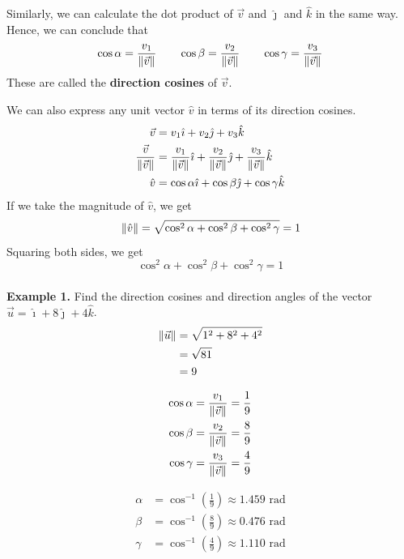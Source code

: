 \newpage
Similarly, we can calculate the dot product of $\vec{v}$ and $\hat{\jmath}$ and
$\hat{k}$ in the same way. Hence, we can conclude that \[\cos\alpha = \frac{v_1}{\left\lVert\vec{v}\right\rVert} \qquad \cos\beta = \frac{v_2}{\left\lVert\vec{v}\right\rVert} \qquad \cos\gamma = \frac{v_3}{\left\lVert\vec{v}\right\rVert}\]
These are called the \textbf{direction cosines} of $\vec{v}$.

We can also express any unit vector $\hat{v}$ in terms of its direction
cosines.
\begin{align*}
    \vec{v}                         & = v_1\hat{\imath} + v_2\hat{\jmath} + v_3\hat{k}                                                                         \\
    \dfrac{\vec{v}}{\left\lVert\vec{v}\right\rVert} & = \dfrac{v_1}{\left\lVert\vec{v}\right\rVert}\hat{\imath} + \dfrac{v_2}{\left\lVert\vec{v}\right\rVert}\hat{\jmath} + \dfrac{v_3}{\left\lVert\vec{v}\right\rVert}\hat{k} \\
    \hat{v}                         & = \cos\alpha\hat{\imath} + \cos\beta\hat{\jmath} + \cos\gamma\hat{k}
\end{align*}
If we take the magnitude of $\hat{v}$, we get \[\left\lVert\hat{v}\right\rVert = \sqrt{\cos^2\alpha + \cos^2\beta + \cos^2\gamma} = 1\] Squaring both sides, we get \[\cos^2\alpha + \cos^2\beta + \cos^2\gamma = 1\]
~\\
\noindent\textbf{Example 1. } Find the direction cosines and direction angles of the vector $\vec{u} = \hat{\imath} + 8\hat{\jmath} + 4\hat{k}$.
\begin{align*}
    \left\lVert\vec{u}\right\rVert & = \sqrt{1^2 + 8^2 + 4^2} \\
                   & = \sqrt{81}              \\
                   & = 9
\end{align*}
\vspace{-5em}
\begin{multicols}{2}
    \begin{align*}
        \cos\alpha & = \frac{v_1}{\left\lVert\vec{v}\right\rVert} = \frac{1}{9} \\
        \cos\beta  & = \frac{v_2}{\left\lVert\vec{v}\right\rVert} = \frac{8}{9} \\
        \cos\gamma & = \frac{v_3}{\left\lVert\vec{v}\right\rVert} = \frac{4}{9}
    \end{align*}

    \begin{align*}
        \alpha & = \cos^{-1}\left(\frac{1}{9}\right) \approx 1.459 \text{ rad} \\
        \beta  & = \cos^{-1}\left(\frac{8}{9}\right) \approx 0.476 \text{ rad} \\
        \gamma & = \cos^{-1}\left(\frac{4}{9}\right) \approx 1.110 \text{ rad}
    \end{align*}
\end{multicols}